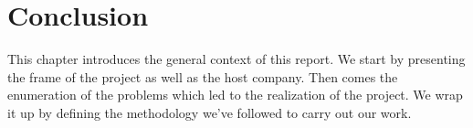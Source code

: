 \setcounter{secnumdepth}{0} %
\section{Conclusion}
This chapter introduces the general context of this report. We start by presenting the frame of the project as well as the host company. Then comes the enumeration of the problems which led to the realization of the project. We wrap it up by defining the methodology we’ve followed to carry out our work. \citep{test1}
